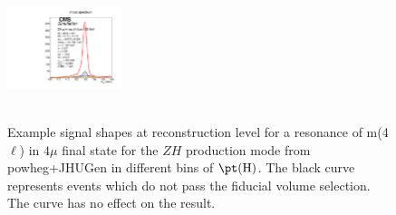 \begin{figure}[htb]
\begin{center}
{      \includegraphics[width=0.3\textwidth,angle=0]{Figures/Appendix//ZH_powheg_JHUgen_125_4mu_pT4l_genbin4_recobin4_effs_genWeight*pileupWeight*dataMCWeight.pdf}
      \label{fig:sigfits-pT4l-ZH-powheg15-JHUgen-125-maintext:e}
    }
     \\
    \\
    \caption{ Example signal shapes at reconstruction level for a resonance of m(4$\ell$) in $4\mu$ final state for the $ZH$ production mode from {\sc powheg+JHUGen} in different bins of $\pt(\mathrm{H})$. The black curve represents events which do not pass the fiducial volume selection. The curve has no effect on the result.
    }
  \label{fig:sigfits-pT4l-ZH-powheg15-JHUgen-125-maintext}
 \end{center}
\end{figure} \clearpage

